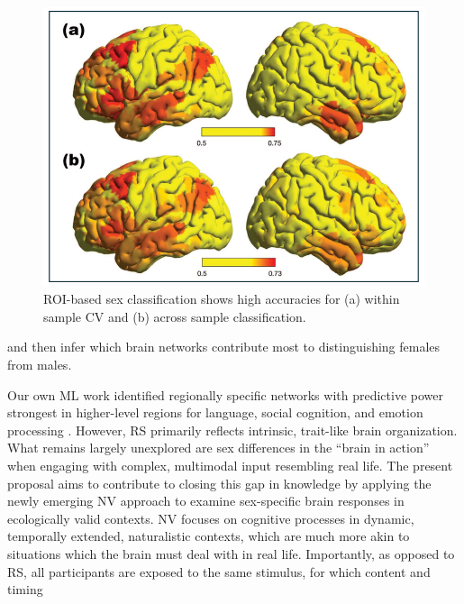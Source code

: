 \documentclass[11pt,a4paper]{article}
\begin{document}
\begin{figure} %
  \vspace{-10pt} %
  \includegraphics[width=\linewidth]{sex_classification.png}
  \caption{ROI-based sex classification shows high accuracies for (a) within sample CV and (b) across sample classification.}
  \label{fig:sexclass}
\end{figure}
and then infer which brain networks contribute most to distinguishing females from males.
\par\vspace{-1\parskip}\noindent
Our own ML work identified regionally specific networks with predictive power strongest in higher-level regions 
for language, social cognition, and emotion processing 
\parencite{weisSexClassificationResting2020a,wierschAccurateSexPrediction2023a,wierschSexDifferencesBrain2021a}.
However, RS primarily reflects intrinsic, trait-like brain organization. \\
What remains largely unexplored are 
sex differences in the “brain in action” when engaging with complex, multimodal input resembling real life. 
The present proposal aims to contribute to closing this gap in knowledge by applying the newly 
emerging NV approach to examine sex-specific brain responses in ecologically valid contexts. 
NV focuses on 
cognitive processes in dynamic, temporally extended, naturalistic contexts, which are much more akin to
situations which the brain must deal with in real life.
Importantly, as opposed to RS, all participants are exposed to the same stimulus, for which content and timing 
\end{document}
